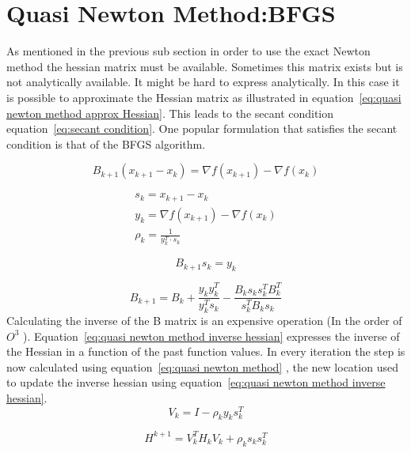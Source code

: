 	\section{Quasi Newton Method:BFGS}
	As mentioned in the previous sub section in order to use the exact Newton method the hessian matrix must be available. Sometimes this matrix exists but is not analytically available. It might be hard to express analytically. In this case it is possible to approximate the Hessian matrix as illustrated in equation~\ref{eq:quasi newton method approx Hessian}. This leads to the secant condition equation~\ref{eq:secant condition}. One popular formulation that satisfies the secant condition is that of the BFGS algorithm.
		
		\begin{equation}
			B_{k+1}(x_{k+1}-x_k) = \nabla f(x_{k+1}) - \nabla f(x_k)
			\label{eq:quasi newton method approx Hessian}	
		\end{equation}
		
		\begin{eqnarray}
			s_k = x_{k+1} - x_{k} \\
			y_k = \nabla f(x_{k+1}) - \nabla f(x_{k}) \\
			\rho_k = \frac{1}{y_k^T \cdot s_k}
		\end{eqnarray}
	
		
		\begin{equation}
			B_{k+1} s_{k} = y_{k}
			\label{eq:secant condition}
		\end{equation}
		
		\begin{equation}
			B_{k+1} = B_{k} + \frac{y_k y_k^T}{ y_k^T s_k} - \frac{B_k s_k s_k^T B_k^T}{s_k^TB_ks_k}
			\label{eq:quasi newton method approx Hessian with past values}
		\end{equation}
	Calculating the inverse of the B matrix is an expensive operation (In the order of $O^3$ ). Equation~\ref{eq:quasi newton method inverse hessian} expresses the inverse of the Hessian in a function of the past function values. In every iteration the step is now calculated using equation~\ref{eq:quasi newton method} , the new location used to update the inverse hessian using equation~\ref{eq:quasi newton method inverse hessian}.
		\begin{equation}
			V_k = I - \rho_ky_ks_k^T
		\end{equation}
	
		\begin{equation}
			H^{k+1} = V_k^TH_kV_k + \rho_ks_ks_k^T
			\label{eq:quasi newton method inverse hessian}	
		\end{equation}
		

